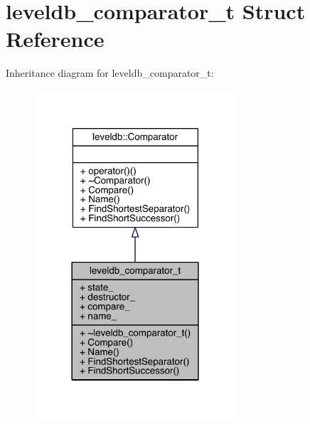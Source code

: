 \hypertarget{structleveldb__comparator__t}{}\section{leveldb\+\_\+comparator\+\_\+t Struct Reference}
\label{structleveldb__comparator__t}


Inheritance diagram for leveldb\+\_\+comparator\+\_\+t\+:\nopagebreak
\begin{figure}[H]
\begin{center}
\leavevmode
\includegraphics[width=213pt]{structleveldb__comparator__t__inherit__graph}
\end{center}
\end{figure}


